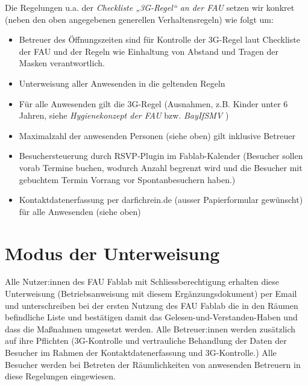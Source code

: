 \documentclass[13pt]{\basedir/fablab-document}
\begin{document}
Die Regelungen u.a. der \emph{Checkliste „3G-Regel“ an der FAU} setzen wir konkret (neben den oben angegebenen generellen Verhaltensregeln) wie folgt um:
\begin{itemize}
  \item  Betreuer des Öffnungszeiten sind für Kontrolle der 3G-Regel laut Checkliste der FAU und der Regeln wie Einhaltung von Abstand und Tragen der Masken verantwortlich.
  \item  Unterweisung aller Anwesenden in die geltenden Regeln
  \item  Für alle Anwesenden gilt die 3G-Regel (Ausnahmen, z.B. Kinder unter 6 Jahren, siehe \emph{Hygienekonzept der FAU} bzw. \emph{BayIfSMV} )
  \item  Maximalzahl der anwesenden Personen (siehe oben) gilt inklusive Betreuer
  \item  Besuchersteuerung durch RSVP-Plugin im Fablab-Kalender (Besucher sollen vorab Termine buchen, wodurch Anzahl begrenzt wird und die Besucher mit gebuchtem Termin Vorrang vor Spontanbesuchern haben.)
  \item  Kontaktdatenerfassung per darfichrein.de (ausser Papierformular gewünscht) für alle Anwesenden (siehe oben)
\end{itemize}



\section{Modus der Unterweisung}
Alle Nutzer:innen des FAU Fablab mit Schliessberechtigung erhalten diese Unterweisung (Betriebsanweisung mit diesem Ergänzungsdokument) per Email und unterschreiben bei der ersten Nutzung des FAU Fablab die in den Räumen befindliche Liste und bestätigen damit das Gelesen-und-Verstanden-Haben und dass die Maßnahmen umgesetzt werden.
Alle Betreuer:innen werden zusätzlich auf ihre Pflichten (3G-Kontrolle und vertrauliche Behandlung der Daten der Besucher im Rahmen der Kontaktdatenerfassung und 3G-Kontrolle.)
Alle Besucher werden bei Betreten der Räumlichkeiten von anwesenden Betreuern in diese Regelungen eingewiesen.

\end{document}
